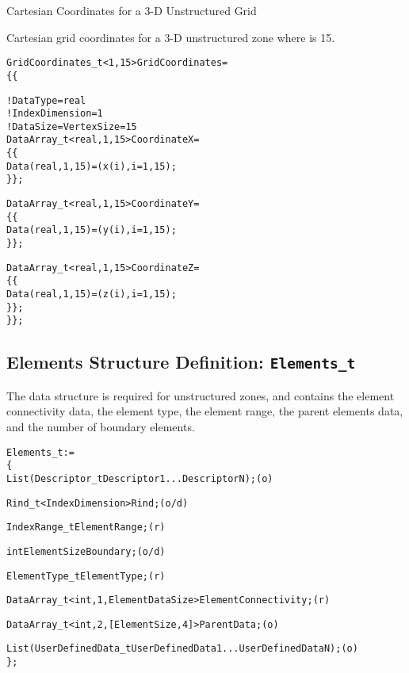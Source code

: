 \begin{example}{Cartesian Coordinates for a 3-D Unstructured Grid}
\label{ex:grid3}

Cartesian grid coordinates for a 3-D unstructured zone where
 is 15.
\begin{alltt}
  GridCoordinates\_t<1, 15> GridCoordinates =
    \{\{

    ! DataType = real
    ! IndexDimension = 1
    ! DataSize = VertexSize = 15
    DataArray\_t<real, 1, 15> CoordinateX =
      \{\{
      Data(real, 1, 15) = (x(i), i=1,15) ;
      \}\} ;

    DataArray\_t<real, 1, 15> CoordinateY =
      \{\{
      Data(real, 1, 15) = (y(i), i=1,15) ;
      \}\} ;

    DataArray\_t<real, 1, 15> CoordinateZ =
      \{\{
      Data(real, 1, 15) = (z(i), i=1,15) ;
      \}\} ;
    \}\} ;
\end{alltt}
\end{example}

\subsection{Elements Structure Definition: \texttt{Elements\_t}}
\label{s:Elements}

The  data structure is required for unstructured
zones, and contains the element connectivity data, the element type,
the element range, the parent elements data, and the number of boundary
elements.

\begin{alltt}
  Elements\_t :=
    \{
    List( Descriptor\_t Descriptor1 ... DescriptorN ) ;                      (o)
 
    Rind\_t<IndexDimension> Rind ;                                           (o/d)

    IndexRange\_t ElementRange ;                                             (r)

    int ElementSizeBoundary ;                                               (o/d)

    ElementType\_t ElementType ;                                             (r)

    DataArray\_t<int, 1, ElementDataSize> ElementConnectivity ;              (r)

    DataArray\_t<int, 2, [ElementSize, 4]> ParentData;                       (o)

    List( UserDefinedData\_t UserDefinedData1 ... UserDefinedDataN ) ;       (o)
    \} ;
\end{alltt}

